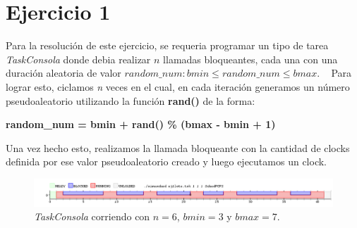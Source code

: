 \section{Ejercicio 1}

Para la resolución de este ejercicio, se requeria programar un tipo de tarea \emph{TaskConsola} donde debia realizar $n$ llamadas bloqueantes, cada una con una duración aleatoria de valor $random\_num: bmin \leq random\_ num \leq bmax$.
~
Para lograr esto, ciclamos \emph{n} veces en el cual, en cada iteración generamos un número pseudoaleatorio utilizando la función \textbf{rand()} de la forma:

\begin{center}
	\textbf{random\_num = bmin + rand() \% (bmax - bmin + 1)}
\end{center}

Una vez hecho esto, realizamos la llamada bloqueante con la cantidad de clocks definida por ese valor pseudoaleatorio creado y luego ejecutamos un clock.

\begin{figure}[!h]
	\begin{center}
		\includegraphics[width=500px]{imagenes/ej1.png}
		\caption{\emph{TaskConsola} corriendo con $n = 6$, $bmin = 3$ y $bmax = 7$.}
	\end{center}
\end{figure}
